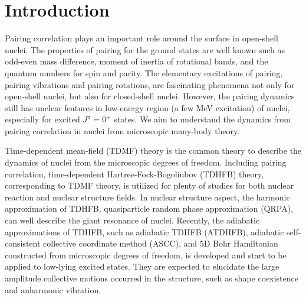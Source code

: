 \documentclass[%
superscriptaddress,
showpacs,
nofootinbib,
amsmath,amssymb,
aps,
prc,
twocolumn,
floatfix ]%
{revtex4-1}
\begin{document}
\section{Introduction}
Pairing correlation plays an important role around the surface in open-shell nuclei. The properties of pairing for the ground states are well known such as odd-even mass difference, moment of inertia of rotational bands, and the quantum numbers for spin and parity. The elementary excitations of pairing, pairing vibrations and pairing rotations, are fascinating phenomena not only for open-shell nuclei, but also for closed-shell nuclei. However, the pairing dynamics still has unclear features in low-energy region (a few MeV excitation) of nuclei, especially for excited $J^{\pi}=0^+$ states. We aim to understand the dynamics from pairing correlation in nuclei from microscopic many-body theory.\par
Time-dependent mean-field (TDMF) theory is the common theory to describe the dynamics of nuclei from the microscopic degrees of freedom. Including pairing correlation, time-dependent Hartree-Fock-Bogoliubov (TDHFB) theory, corresponding to TDMF theory, is utilized for plenty of studies for both nuclear reaction and nuclear structure fields. In nuclear structure aspect, the harmonic approximation of TDHFB, quasiparticle random phase approximation (QRPA), can well describe the giant resonance of nuclei. Recently, the adiabatic approximations of TDHFB, such as adiabatic TDHFB (ATDHFB), adiabatic self-consistent collective coordinate method (ASCC), and 5D Bohr Hamiltonian constructed from microscopic degrees of freedom, is developed and start to be applied to low-lying excited states. They are expected to elucidate the large amplitude collective motions occurred in the structure, such as shape coexistence and anharmonic vibration. \par
\end{document}
